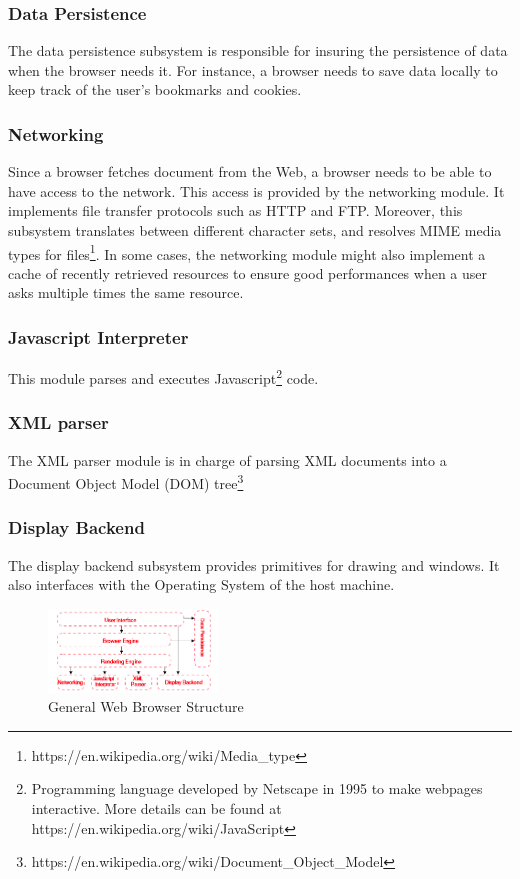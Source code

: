 \documentclass[journal]{IEEEtran}
\begin{document}
\subsubsection{Data Persistence}
The data persistence subsystem is responsible for insuring the persistence of data when the browser needs it. For instance, a browser needs to save data locally to keep track of the user's bookmarks and cookies.

\subsubsection{Networking}
Since a browser fetches document from the Web, a browser needs to be able to have access to the network. This access is provided by the networking module. It implements file transfer protocols such as HTTP and FTP. Moreover, this subsystem translates between different character sets, and resolves MIME media types for files\footnote{https://en.wikipedia.org/wiki/Media\_type}. In some cases, the networking module might also implement a cache of recently retrieved resources to ensure good performances when a user asks multiple times the same resource.

\subsubsection{Javascript Interpreter}
This module parses and executes Javascript\footnote{Programming language developed by Netscape in 1995 to make webpages interactive. More details can be found at https://en.wikipedia.org/wiki/JavaScript} code.

\subsubsection{XML parser}
The XML parser module is in charge of parsing XML documents into a Document Object Model (DOM) tree\footnote{https://en.wikipedia.org/wiki/Document\_Object\_Model}

\subsubsection{Display Backend}
The display backend subsystem provides primitives for drawing and windows. It also interfaces with the Operating System of the host machine.

\begin{figure}[h]
\centering
\includegraphics[width=0.4\textwidth]{images/BrowserStructure.png}
\caption{General Web Browser Structure}
\label{fig:browserStructure}
\end{figure}
\end{document}
